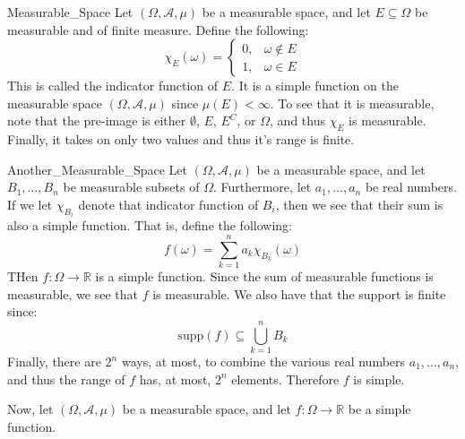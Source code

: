     \begin{lexample}{}{Measurable_Space}
        Let $(\Omega,\mathcal{A},\mu)$ be a measurable
        space, and let $E\subseteq\Omega$ be measurable
        and of finite measure. Define the following:
        \begin{equation}
            \chi_{E}(\omega)=
            \begin{cases}
                0,&\omega\notin{E}\\
                1,&\omega\in{E}
            \end{cases}
        \end{equation}
        This is called the indicator function of
        $E$. It is a simple function on the measurable
        space $(\Omega,\mathcal{A},\mu)$ since
        $\mu(E)<\infty$. To see that it is measurable,
        note that the pre-image is either
        $\emptyset$, $E$, $E^{C}$, or $\Omega$, and thus
        $\chi_{E}$ is measurable. Finally, it takes on
        only two values and thus it's range is finite.
    \end{lexample}
    \begin{lexample}{}{Another_Measurable_Space}
        Let $(\Omega,\mathcal{A},\mu)$ be a measurable
        space, and let $B_{1},\dots,B_{n}$ be measurable
        subsets of $\Omega$. Furthermore, let
        $a_{1},\dots,a_{n}$ be real numbers. If we let
        $\chi_{B_{i}}$ denote that indicator
        function of $B_{i}$, then we see that their sum
        is also a simple function. That is, define the
        following:
        \begin{equation}
            f(\omega)=\sum_{k=1}^{n}
                a_{k}\chi_{B_{k}}(\omega)
        \end{equation}
        THen $f:\Omega\rightarrow\mathbb{R}$ is a simple
        function. Since the sum of measurable functions
        is measurable, we see that $f$ is measurable.
        We also have that the support is finite since:
        \begin{equation}
            \mathrm{supp}(f)\subseteq\bigcup_{k=1}^{n}B_{k}
        \end{equation}
        Finally, there are $2^{n}$ ways, at most, to
        combine the various real numbers
        $a_{1},\dots,a_{n}$, and thus the range of
        $f$ has, at most, $2^{n}$ elements. Therefore
        $f$ is simple.
    \end{lexample}
    Now, let $(\Omega,\mathcal{A},\mu)$ be a
    measurable space, and let
    $f:\Omega\rightarrow\mathbb{R}$ be a simple function.
